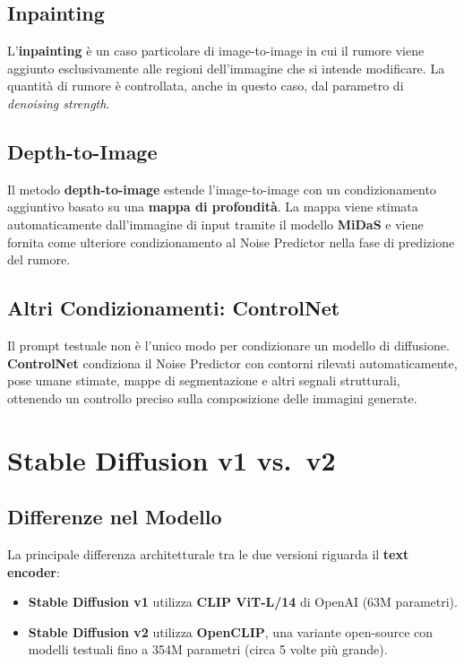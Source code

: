 \subsection{Inpainting}
\label{subsec:inpainting}

L'\textbf{inpainting} è un caso particolare di image-to-image in cui
il rumore viene aggiunto esclusivamente alle regioni dell'immagine che
si intende modificare. La quantità di rumore è controllata, anche in
questo caso, dal parametro di \emph{denoising strength}.

\subsection{Depth-to-Image}
\label{subsec:depth2img}

Il metodo \textbf{depth-to-image} estende l'image-to-image con un
condizionamento aggiuntivo basato su una \textbf{mappa di profondità}.
La mappa viene stimata automaticamente dall'immagine di input tramite
il modello \textbf{MiDaS} e viene fornita come ulteriore condizionamento
al Noise Predictor nella fase di predizione del rumore.

\subsection{Altri Condizionamenti: ControlNet}
\label{subsec:controlnet}

Il prompt testuale non è l'unico modo per condizionare un modello di
diffusione. \textbf{ControlNet} condiziona il Noise Predictor con
contorni rilevati automaticamente, pose umane stimate, mappe di
segmentazione e altri segnali strutturali, ottenendo un controllo
preciso sulla composizione delle immagini generate.

\section{Stable Diffusion v1 vs.\ v2}
\label{sec:sd-v1-v2}

\subsection{Differenze nel Modello}
\label{subsec:v1v2-model}

La principale differenza architetturale tra le due versioni riguarda
il \textbf{text encoder}:

\begin{itemize}
  \item \textbf{Stable Diffusion v1} utilizza \textbf{CLIP ViT-L/14}
        di OpenAI (63M parametri).
  \item \textbf{Stable Diffusion v2} utilizza \textbf{OpenCLIP},
        una variante open-source con modelli testuali fino a
        354M parametri (circa 5 volte più grande).
\end{itemize}

